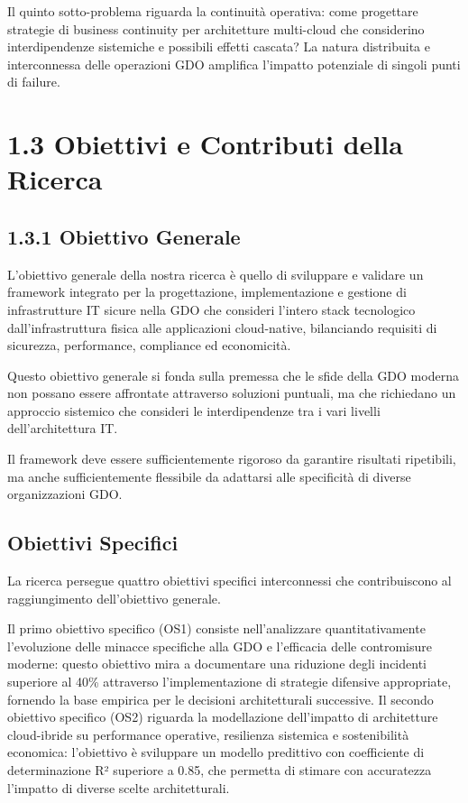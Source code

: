 \documentclass{report}
\begin{document}
Il quinto sotto-problema riguarda la continuità operativa: come
progettare strategie di business continuity per architetture multi-cloud
che considerino interdipendenze sistemiche e possibili effetti cascata?
La natura distribuita e interconnessa delle operazioni GDO amplifica
l'impatto potenziale di singoli punti di failure.

\section{\texorpdfstring{\textbf{1.3 Obiettivi e Contributi della
Ricerca}}{1.3 Obiettivi e Contributi della Ricerca}}\label{obiettivi-e-contributi-della-ricerca}

\subsection{\texorpdfstring{\textbf{1.3.1 Obiettivo
Generale}}{1.3.1 Obiettivo Generale}}\label{obiettivo-generale}

L'obiettivo generale della nostra ricerca è quello di sviluppare e
validare un framework integrato per la progettazione, implementazione e
gestione di infrastrutture IT sicure nella GDO che consideri l'intero
stack tecnologico dall'infrastruttura fisica alle applicazioni
cloud-native, bilanciando requisiti di sicurezza, performance,
compliance ed economicità.

Questo obiettivo generale si fonda sulla premessa che le sfide della GDO
moderna non possano essere affrontate attraverso soluzioni puntuali, ma
che richiedano un approccio sistemico che consideri le interdipendenze
tra i vari livelli dell'architettura IT.

Il framework deve essere sufficientemente rigoroso da garantire
risultati ripetibili, ma anche sufficientemente flessibile da adattarsi
alle specificità di diverse organizzazioni GDO.

\subsection{\texorpdfstring{\textbf{Obiettivi
Specifici}}{1.3.2 Obiettivi Specifici}}\label{obiettivi-specifici}

La ricerca persegue quattro obiettivi specifici interconnessi che
contribuiscono al raggiungimento dell'obiettivo generale.

Il primo obiettivo specifico (OS1) consiste nell'analizzare
quantitativamente l'evoluzione delle minacce specifiche alla GDO e
l'efficacia delle contromisure moderne: questo obiettivo mira a
documentare una riduzione degli incidenti superiore al 40\% attraverso l'implementazione di strategie difensive appropriate, fornendo la base empirica per le decisioni architetturali successive.
Il secondo obiettivo specifico (OS2) riguarda la modellazione
dell'impatto di architetture cloud-ibride su performance operative, resilienza sistemica e sostenibilità economica: l'obiettivo è sviluppare un modello predittivo con coefficiente di determinazione R² superiore a 0.85, che permetta di stimare con accuratezza l'impatto di diverse scelte architetturali.
\end{document}
